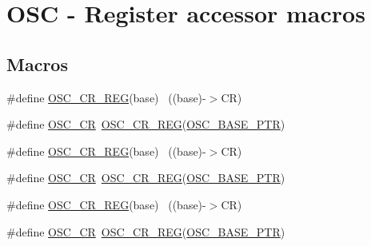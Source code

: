 \hypertarget{group___o_s_c___register___accessor___macros}{}\section{O\+SC -\/ Register accessor macros}
\label{group___o_s_c___register___accessor___macros}
\subsection*{Macros}
\begin{DoxyCompactItemize}
\item 
\#define \hyperlink{group___o_s_c___register___accessor___macros_ga986cf8366f7686523f323c907f34222e}{O\+S\+C\+\_\+\+C\+R\+\_\+\+R\+EG}(base)                                              ~((base)-\/$>$CR)
\item 
\#define \hyperlink{group___o_s_c___register___accessor___macros_ga4361def829ba760e782fbd2f74eb0e19}{O\+S\+C\+\_\+\+CR}~\hyperlink{group___o_s_c___register___accessor___macros_ga986cf8366f7686523f323c907f34222e}{O\+S\+C\+\_\+\+C\+R\+\_\+\+R\+EG}(\hyperlink{group___o_s_c___peripheral_gaf1086ccc399b36fe95a52c677e9936ac}{O\+S\+C\+\_\+\+B\+A\+S\+E\+\_\+\+P\+TR})
\item 
\#define \hyperlink{group___o_s_c___register___accessor___macros_ga986cf8366f7686523f323c907f34222e}{O\+S\+C\+\_\+\+C\+R\+\_\+\+R\+EG}(base)                                              ~((base)-\/$>$CR)
\item 
\#define \hyperlink{group___o_s_c___register___accessor___macros_ga4361def829ba760e782fbd2f74eb0e19}{O\+S\+C\+\_\+\+CR}~\hyperlink{group___o_s_c___register___accessor___macros_ga986cf8366f7686523f323c907f34222e}{O\+S\+C\+\_\+\+C\+R\+\_\+\+R\+EG}(\hyperlink{group___o_s_c___peripheral_gaf1086ccc399b36fe95a52c677e9936ac}{O\+S\+C\+\_\+\+B\+A\+S\+E\+\_\+\+P\+TR})
\item 
\#define \hyperlink{group___o_s_c___register___accessor___macros_ga986cf8366f7686523f323c907f34222e}{O\+S\+C\+\_\+\+C\+R\+\_\+\+R\+EG}(base)                                              ~((base)-\/$>$CR)
\item 
\#define \hyperlink{group___o_s_c___register___accessor___macros_ga4361def829ba760e782fbd2f74eb0e19}{O\+S\+C\+\_\+\+CR}~\hyperlink{group___o_s_c___register___accessor___macros_ga986cf8366f7686523f323c907f34222e}{O\+S\+C\+\_\+\+C\+R\+\_\+\+R\+EG}(\hyperlink{group___o_s_c___peripheral_gaf1086ccc399b36fe95a52c677e9936ac}{O\+S\+C\+\_\+\+B\+A\+S\+E\+\_\+\+P\+TR})
\end{DoxyCompactItemize}


